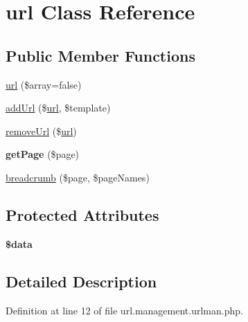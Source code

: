 \hypertarget{classurl}{\section{url Class Reference}
\label{classurl}
}
\subsection*{Public Member Functions}
\begin{DoxyCompactItemize}
\item 
\hyperlink{classurl_ac3ad0a893ce447a4b92b7bea59371f02}{url} (\$array=false)
\item 
\hyperlink{classurl_ab302f269413f4e58217d5801cd52ca39}{add\-Url} (\$\hyperlink{classurl}{url}, \$template)
\item 
\hyperlink{classurl_a3022830a582288c8216b5cbfaed1dec7}{remove\-Url} (\$\hyperlink{classurl}{url})
\item 
\hypertarget{classurl_a259aafa22bfa702c4309ab5bbf975f78}{{\bfseries get\-Page} (\$page)}\label{classurl_a259aafa22bfa702c4309ab5bbf975f78}

\item 
\hyperlink{classurl_ad78ae85a173fbd81e6668608a1c49106}{breadcrumb} (\$page, \$page\-Names)
\end{DoxyCompactItemize}
\subsection*{Protected Attributes}
\begin{DoxyCompactItemize}
\item 
\hypertarget{classurl_a6efc15b5a2314dd4b5aaa556a375c6d6}{{\bfseries \$data}}\label{classurl_a6efc15b5a2314dd4b5aaa556a375c6d6}

\end{DoxyCompactItemize}


\subsection{Detailed Description}


Definition at line 12 of file url.\-management.\-urlman.\-php.



